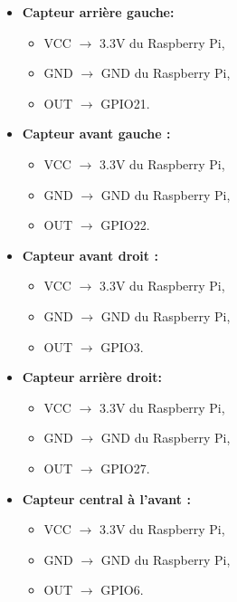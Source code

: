 \begin{itemize}
    \item \textbf{Capteur arrière gauche:}
    \begin{itemize}
        \item VCC $\rightarrow$ 3.3V du Raspberry Pi,
        \item GND $\rightarrow$ GND du Raspberry Pi,
        \item OUT $\rightarrow$ GPIO21.
    \end{itemize}

    \item \textbf{Capteur avant gauche  :}
    \begin{itemize}
        \item VCC $\rightarrow$ 3.3V du Raspberry Pi,
        \item GND $\rightarrow$ GND du Raspberry Pi,
        \item OUT $\rightarrow$ GPIO22.
    \end{itemize}

    \item \textbf{Capteur avant droit :}
    \begin{itemize}
        \item VCC $\rightarrow$ 3.3V du Raspberry Pi,
        \item GND $\rightarrow$ GND du Raspberry Pi,
        \item OUT $\rightarrow$ GPIO3.
    \end{itemize}

    \item \textbf{Capteur arrière droit:}
    \begin{itemize}
        \item VCC $\rightarrow$ 3.3V du Raspberry Pi,
        \item GND $\rightarrow$ GND du Raspberry Pi,
        \item OUT $\rightarrow$ GPIO27.
    \end{itemize}

    \item \textbf{Capteur central à l’avant :}
    \begin{itemize}
        \item VCC $\rightarrow$ 3.3V du Raspberry Pi,
        \item GND $\rightarrow$ GND du Raspberry Pi,
        \item OUT $\rightarrow$ GPIO6.
    \end{itemize}
\end{itemize}


